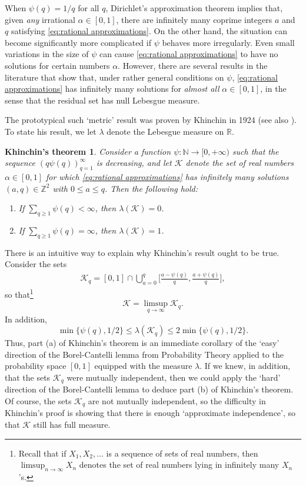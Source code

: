 \documentclass[12pt]{amsart}
\numberwithin{equation}{section}
\newtheorem*{kthm}{Khinchin's theorem}
\theoremstyle{definition}
\theoremstyle{remark}
\newcommand{\N}{\mathbb{N}}
\newcommand{\Z}{\mathbb{Z}}
\newcommand{\R}{\mathbb{R}}
\newcommand{\CK}{\mathcal{K}}
\newcommand{\eq}[1]{ \begin{equation} \begin{split} #1 \end{split} \end{equation} }
\renewcommand{\le}{\leqslant}
\renewcommand{\ge}{\geqslant}
\begin{document}
When $\psi(q)=1/q$ for all $q$, Dirichlet's approximation theorem implies that, given {\it any} irrational $\alpha\in[0,1]$, there are  infinitely many coprime integers $a$ and $q$ satisfying  \eqref{eq:rational approximations}. On the other hand, the situation can become significantly more complicated if $\psi$ behaves more irregularly. Even small variations in the size of $\psi$ can cause \eqref{eq:rational approximations} to have no solutions for certain numbers $\alpha$. However, there are several results in the literature that show that, under rather general conditions on $\psi$, \eqref{eq:rational approximations} has infinitely many solutions for {\it almost all} $\alpha\in[0,1]$, in the sense that the residual set has null Lebesgue measure. 

The prototypical such `metric' result was proven by Khinchin in 1924 \cite{Khinchin-paper} (see also \cite[Theorem 32]{Khinchin-book}). To state his result, we let $\lambda$ denote the Lebesgue measure on $\R$.

\begin{kthm}
Consider a function $\psi:\N\to[0,+\infty)$ such that the sequence $(q\psi(q))_{q=1}^\infty$ is decreasing, and let $\CK$ denote the set of real numbers $\alpha\in[0,1]$ for which \eqref{eq:rational approximations} has infinitely many solutions $(a,q)\in\Z^2$ with $0\le a\le q$. Then the following hold:
\begin{enumerate}
	\item If $\sum_{q\ge1} \psi(q)<\infty$, then $\lambda(\CK)=0$.
	\item  If $\sum_{q\ge1} \psi(q)=\infty$, then $\lambda(\CK)=1$.
\end{enumerate}
\end{kthm}
There is an intuitive way to explain why Khinchin's result ought to be true. Consider the sets
\eq{\label{def:K_q}
\CK_q= [0,1]\cap \bigcup_{a=0}^q   \Big[\frac{a-\psi(q)}{q}, \frac{a+\psi(q)}{q}\Big] ,
}
so that\footnote{Recall that if $X_1,X_2,\dots$ is a sequence of sets of real numbers, then $\limsup_{n\to\infty}X_n$ denotes the set of real numbers lying in infinitely many $X_n$'s.}
\[
\CK
	=\limsup_{q\to\infty}\CK_q.
\]
In addition,
\[
\min\{\psi(q),1/2\}\le \lambda(\CK_q)\le 2\min\{\psi(q),1/2\}.
\]
Thus, part (a) of Khinchin's theorem is an immediate corollary of the `easy' direction of the Borel-Cantelli lemma from Probability Theory \cite[Lemma 1.2]{harman} applied to the probability space $[0,1]$ equipped with the measure $\lambda$. If we knew, in addition, that the sets $\CK_q$ were mutually independent, then we could apply the `hard' direction of the Borel-Cantelli lemma \cite[Lemma 1.3]{harman} to deduce part (b) of Khinchin's theorem. Of course, the sets $\CK_q$ are not mutually independent, so the difficulty in Khinchin's proof is showing that there is enough `approximate independence', so that $\CK$ still has full measure.
\end{document}

